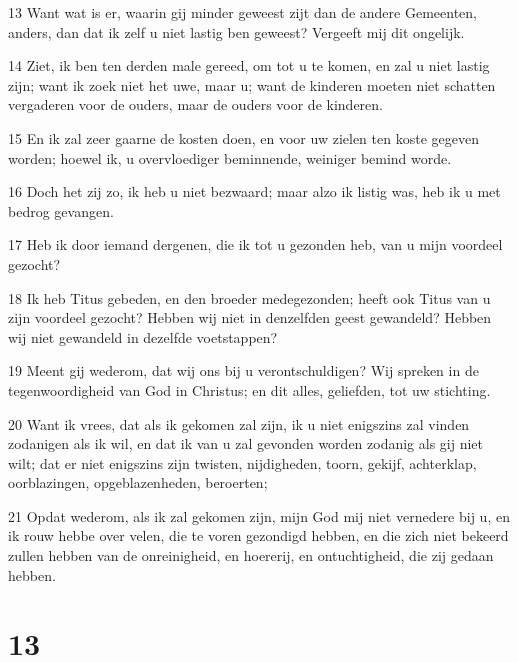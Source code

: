 \par 13 Want wat is er, waarin gij minder geweest zijt dan de andere Gemeenten, anders, dan dat ik zelf u niet lastig ben geweest? Vergeeft mij dit ongelijk.
\par 14 Ziet, ik ben ten derden male gereed, om tot u te komen, en zal u niet lastig zijn; want ik zoek niet het uwe, maar u; want de kinderen moeten niet schatten vergaderen voor de ouders, maar de ouders voor de kinderen.
\par 15 En ik zal zeer gaarne de kosten doen, en voor uw zielen ten koste gegeven worden; hoewel ik, u overvloediger beminnende, weiniger bemind worde.
\par 16 Doch het zij zo, ik heb u niet bezwaard; maar alzo ik listig was, heb ik u met bedrog gevangen.
\par 17 Heb ik door iemand dergenen, die ik tot u gezonden heb, van u mijn voordeel gezocht?
\par 18 Ik heb Titus gebeden, en den broeder medegezonden; heeft ook Titus van u zijn voordeel gezocht? Hebben wij niet in denzelfden geest gewandeld? Hebben wij niet gewandeld in dezelfde voetstappen?
\par 19 Meent gij wederom, dat wij ons bij u verontschuldigen? Wij spreken in de tegenwoordigheid van God in Christus; en dit alles, geliefden, tot uw stichting.
\par 20 Want ik vrees, dat als ik gekomen zal zijn, ik u niet enigszins zal vinden zodanigen als ik wil, en dat ik van u zal gevonden worden zodanig als gij niet wilt; dat er niet enigszins zijn twisten, nijdigheden, toorn, gekijf, achterklap, oorblazingen, opgeblazenheden, beroerten;
\par 21 Opdat wederom, als ik zal gekomen zijn, mijn God mij niet vernedere bij u, en ik rouw hebbe over velen, die te voren gezondigd hebben, en die zich niet bekeerd zullen hebben van de onreinigheid, en hoererij, en ontuchtigheid, die zij gedaan hebben.

\chapter{13}

